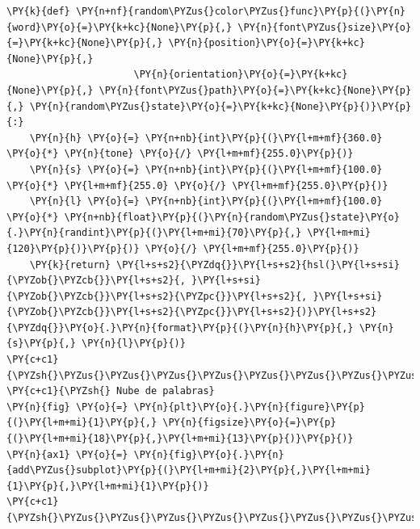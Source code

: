     \begin{tcolorbox}[breakable, size=fbox, boxrule=1pt, pad at break*=1mm,colback=cellbackground, colframe=cellborder]
\begin{Verbatim}[commandchars=\\\{\}]
\PY{k}{def} \PY{n+nf}{random\PYZus{}color\PYZus{}func}\PY{p}{(}\PY{n}{word}\PY{o}{=}\PY{k+kc}{None}\PY{p}{,} \PY{n}{font\PYZus{}size}\PY{o}{=}\PY{k+kc}{None}\PY{p}{,} \PY{n}{position}\PY{o}{=}\PY{k+kc}{None}\PY{p}{,}
                      \PY{n}{orientation}\PY{o}{=}\PY{k+kc}{None}\PY{p}{,} \PY{n}{font\PYZus{}path}\PY{o}{=}\PY{k+kc}{None}\PY{p}{,} \PY{n}{random\PYZus{}state}\PY{o}{=}\PY{k+kc}{None}\PY{p}{)}\PY{p}{:}
    \PY{n}{h} \PY{o}{=} \PY{n+nb}{int}\PY{p}{(}\PY{l+m+mf}{360.0} \PY{o}{*} \PY{n}{tone} \PY{o}{/} \PY{l+m+mf}{255.0}\PY{p}{)}
    \PY{n}{s} \PY{o}{=} \PY{n+nb}{int}\PY{p}{(}\PY{l+m+mf}{100.0} \PY{o}{*} \PY{l+m+mf}{255.0} \PY{o}{/} \PY{l+m+mf}{255.0}\PY{p}{)}
    \PY{n}{l} \PY{o}{=} \PY{n+nb}{int}\PY{p}{(}\PY{l+m+mf}{100.0} \PY{o}{*} \PY{n+nb}{float}\PY{p}{(}\PY{n}{random\PYZus{}state}\PY{o}{.}\PY{n}{randint}\PY{p}{(}\PY{l+m+mi}{70}\PY{p}{,} \PY{l+m+mi}{120}\PY{p}{)}\PY{p}{)} \PY{o}{/} \PY{l+m+mf}{255.0}\PY{p}{)}
    \PY{k}{return} \PY{l+s+s2}{\PYZdq{}}\PY{l+s+s2}{hsl(}\PY{l+s+si}{\PYZob{}\PYZcb{}}\PY{l+s+s2}{, }\PY{l+s+si}{\PYZob{}\PYZcb{}}\PY{l+s+s2}{\PYZpc{}}\PY{l+s+s2}{, }\PY{l+s+si}{\PYZob{}\PYZcb{}}\PY{l+s+s2}{\PYZpc{}}\PY{l+s+s2}{)}\PY{l+s+s2}{\PYZdq{}}\PY{o}{.}\PY{n}{format}\PY{p}{(}\PY{n}{h}\PY{p}{,} \PY{n}{s}\PY{p}{,} \PY{n}{l}\PY{p}{)}
\PY{c+c1}{\PYZsh{}\PYZus{}\PYZus{}\PYZus{}\PYZus{}\PYZus{}\PYZus{}\PYZus{}\PYZus{}\PYZus{}\PYZus{}\PYZus{}\PYZus{}\PYZus{}\PYZus{}\PYZus{}\PYZus{}\PYZus{}\PYZus{}\PYZus{}\PYZus{}\PYZus{}\PYZus{}\PYZus{}\PYZus{}\PYZus{}\PYZus{}\PYZus{}\PYZus{}\PYZus{}\PYZus{}\PYZus{}\PYZus{}\PYZus{}\PYZus{}\PYZus{}\PYZus{}\PYZus{}\PYZus{}\PYZus{}\PYZus{}\PYZus{}\PYZus{}\PYZus{}\PYZus{}\PYZus{}}
\PY{c+c1}{\PYZsh{} Nube de palabras}
\PY{n}{fig} \PY{o}{=} \PY{n}{plt}\PY{o}{.}\PY{n}{figure}\PY{p}{(}\PY{l+m+mi}{1}\PY{p}{,} \PY{n}{figsize}\PY{o}{=}\PY{p}{(}\PY{l+m+mi}{18}\PY{p}{,}\PY{l+m+mi}{13}\PY{p}{)}\PY{p}{)}
\PY{n}{ax1} \PY{o}{=} \PY{n}{fig}\PY{o}{.}\PY{n}{add\PYZus{}subplot}\PY{p}{(}\PY{l+m+mi}{2}\PY{p}{,}\PY{l+m+mi}{1}\PY{p}{,}\PY{l+m+mi}{1}\PY{p}{)}
\PY{c+c1}{\PYZsh{}\PYZus{}\PYZus{}\PYZus{}\PYZus{}\PYZus{}\PYZus{}\PYZus{}\PYZus{}\PYZus{}\PYZus{}\PYZus{}\PYZus{}\PYZus{}\PYZus{}\PYZus{}\PYZus{}\PYZus{}\PYZus{}\PYZus{}\PYZus{}\PYZus{}\PYZus{}\PYZus{}\PYZus{}\PYZus{}\PYZus{}\PYZus{}\PYZus{}\PYZus{}\PYZus{}\PYZus{}\PYZus{}\PYZus{}\PYZus{}\PYZus{}\PYZus{}\PYZus{}\PYZus{}\PYZus{}\PYZus{}\PYZus{}\PYZus{}\PYZus{}\PYZus{}\PYZus{}\PYZus{}\PYZus{}\PYZus{}\PYZus{}\PYZus{}\PYZus{}\PYZus{}\PYZus{}\PYZus{}\PYZus{}}

\end{Verbatim}
\end{tcolorbox}

